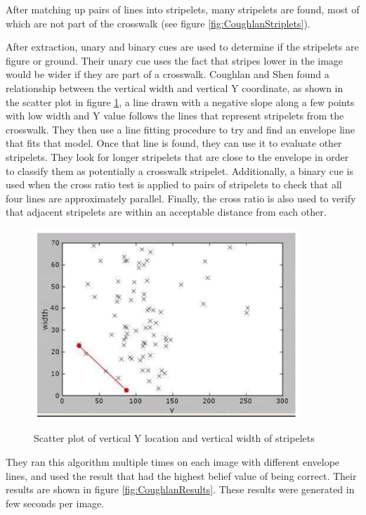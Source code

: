 \documentclass[12pt]{ucthesis}
\newcommand{\captionfonts}{\small\bf\ssp}
\begin{document}
After matching up pairs of lines into stripelets, many stripelets are found, most of which are not part of the crosswalk (see figure \ref{fig:CoughlanStriplets}).

After extraction, unary and binary cues are used to determine if the stripelets are figure or ground. Their unary cue uses the fact that stripes lower in the image would be wider if they are part of a crosswalk. Coughlan and Shen found a relationship between the vertical width and vertical Y coordinate, as shown in the scatter plot in figure \ref{fig:CoughlanScatter}, a line drawn with a negative slope along a few points with low width and Y value follows the lines that represent stripelets from the crosswalk. They then use a line fitting procedure to try and find an envelope line that fits that model. Once that line is found, they can use it to evaluate other stripelets. They look for longer stripelets that are close to the envelope in order to classify them as potentially a crosswalk stripelet. Additionally, a binary cue is used when the cross ratio test is applied to pairs of stripelets to check that all four lines are approximately parallel. Finally, the cross ratio is also used to verify that adjacent stripelets are within an acceptable distance from each other. 

\begin{figure}[t]
\begin{center}
\includegraphics[width=10cm]{CoughlanScatter.png}
\captionfonts
\caption[Coughlan Scatterplot of Y and Vertical Width]{Scatter plot of vertical Y location and vertical width of stripelets \cite{Coughlan2006}}
\label{fig:CoughlanScatter}
\end{center}
\end{figure}

They ran this algorithm multiple times on each image with different envelope lines, and used the result that had the highest belief value of being correct. Their results are shown in figure \ref{fig:CoughlanResults}. These results were generated in few seconds per image. 
\end{document}
